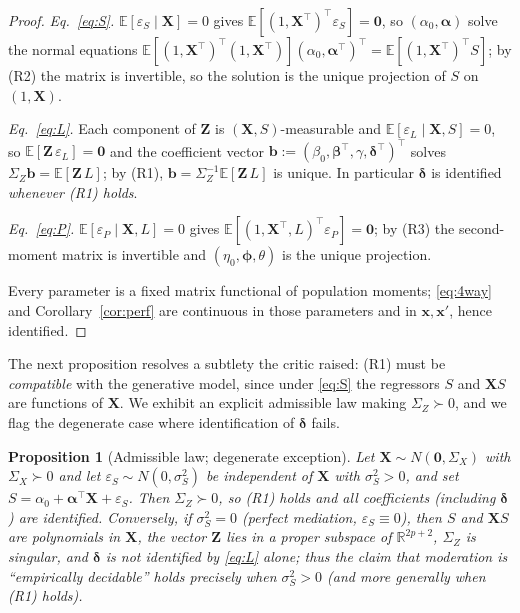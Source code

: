 \documentclass{amsart}
\theoremstyle{definition}
\theoremstyle{plain}
\newtheorem{proposition}{Proposition}
\begin{document}
\begin{proof}
\emph{Eq.\ \eqref{eq:S}.} $\mathbb E[\varepsilon_S\mid\bm X]=0$ gives
$\mathbb E[(1,\bm X^\top)^\top\varepsilon_S]=\bm0$, so $(\alpha_0,\bm\alpha)$ solve the normal
equations $\mathbb E[(1,\bm X^\top)^\top(1,\bm X^\top)](\alpha_0,\bm\alpha^\top)^\top
=\mathbb E[(1,\bm X^\top)^\top S]$; by (R2) the matrix is invertible, so the solution is the
unique projection of $S$ on $(1,\bm X)$.

\emph{Eq.\ \eqref{eq:L}.} Each component of $\bm Z$ is $(\bm X,S)$-measurable and
$\mathbb E[\varepsilon_L\mid\bm X,S]=0$, so $\mathbb E[\bm Z\,\varepsilon_L]=\bm0$ and the
coefficient vector $\bm b:=(\beta_0,\bm\beta^\top,\gamma,\bm\delta^\top)^\top$ solves
$\Sigma_Z\bm b=\mathbb E[\bm Z\,L]$; by (R1), $\bm b=\Sigma_Z^{-1}\mathbb E[\bm Z\,L]$ is
unique. In particular $\bm\delta$ is identified \emph{whenever (R1) holds}.

\emph{Eq.\ \eqref{eq:P}.} $\mathbb E[\varepsilon_P\mid\bm X,L]=0$ gives
$\mathbb E[(1,\bm X^\top,L)^\top\varepsilon_P]=\bm0$; by (R3) the second-moment matrix is
invertible and $(\eta_0,\bm\phi,\theta)$ is the unique projection.

Every parameter is a fixed matrix functional of population moments; \eqref{eq:4way} and
Corollary~\ref{cor:perf} are continuous in those parameters and in $\bm x,\bm x'$, hence
identified.
\end{proof}

The next proposition resolves a subtlety the critic raised: (R1) must be \emph{compatible}
with the generative model, since under \eqref{eq:S} the regressors $S$ and $\bm X S$ are
functions of $\bm X$. We exhibit an explicit admissible law making $\Sigma_Z\succ0$, and we
flag the degenerate case where identification of $\bm\delta$ fails.

\begin{proposition}[Admissible law; degenerate exception]\label{prop:law}
Let $\bm X\sim N(\bm0,\Sigma_X)$ with $\Sigma_X\succ0$ and let
$\varepsilon_S\sim N(0,\sigma_S^2)$ be independent of $\bm X$ with $\sigma_S^2>0$, and set
$S=\alpha_0+\bm\alpha^\top\bm X+\varepsilon_S$. Then $\Sigma_Z\succ0$, so (R1) holds and all
coefficients (including $\bm\delta$) are identified. Conversely, if $\sigma_S^2=0$ (perfect
mediation, $\varepsilon_S\equiv0$), then $S$ and $\bm X S$ are polynomials in $\bm X$, the
vector $\bm Z$ lies in a proper subspace of $\mathbb R^{2p+2}$, $\Sigma_Z$ is singular, and
$\bm\delta$ is \emph{not} identified by \eqref{eq:L} alone; thus the claim that moderation is
``empirically decidable'' holds precisely when $\sigma_S^2>0$ (and more generally when (R1)
holds).
\end{proposition}
\end{document}
